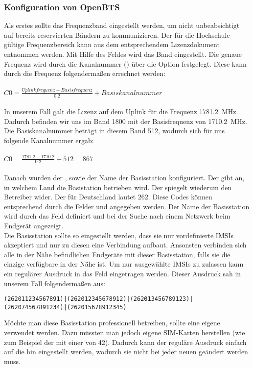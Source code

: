 \subsubsection{Konfiguration von OpenBTS}
Als erstes sollte das Frequenzband eingestellt werden, um nicht unbeabsichtigt auf bereits reservierten Bändern zu kommunizieren.  Der für die Hochschule gültige Frequenzbereich kann aus dem entsprechendem Lizenzdokument entnommen werden. Mit Hilfe des Feldes  wird das Band eingestellt. Die genaue Frequenz wird durch die Kanalnummer (\ARFCN) über die Option  festgelegt. Diese kann durch die Frequenz folgendermaßen errechnet werden:\\ \\
$ C0 = \frac{Uplinkfrequenz - Basisfrequenz}{0.2} + Basiskanalnummer $ \\ \\
In unserem Fall galt die Lizenz auf dem Uplink für die Frequenz \SI{1781.2}{\mega\hertz}. Dadurch befinden wir uns im Band 1800 mit der Basisfrequenz von \SI{1710.2}{\mega\hertz}. Die Basiskanalnummer beträgt in diesem Band 512, wodurch sich für uns folgende Kanalnummer ergab:\\ \\
$ C0 = \frac{1781.2 - 1710.2}{0.2} + 512 = 867 $ \\ \\
Danach wurden der \MCC, \MNC sowie der Name der Basisstation konfiguriert. Der \MCC gibt an, in welchem Land die Basistation betrieben wird. Der \MNC spiegelt wiederum den Betreiber wider. Der \MCC für Deutschland lautet 262. Diese Codes können entsprechend durch die Felder  und  angegeben werden. Der Name der Basisstation wird durch das Feld  definiert und bei der Suche nach einem Netzwerk beim Endgerät angezeigt. \\
Die Basisstation sollte so eingestellt werden, dass sie nur vordefinierte \acp{IMSI} akzeptiert und nur zu diesen eine Verbindung aufbaut. Ansonsten verbinden sich alle in der Nähe befindlichen Endgeräte mit dieser Basisstation, falls sie die einzige verfügbare in der Nähe ist. Um nur ausgewählte \acp{IMSI} zu zulassen kann ein regulärer Ausdruck in das Feld  eingetragen werden. Dieser Ausdruck sah in unserem Fall folgendermaßen aus: \\
\begin{lstlisting}
(262011234567891)|(262012345678912)|(262013456789123)|
(262074567891234)|(262015678912345)
\end{lstlisting}
Möchte man diese Basisstation professionell betreiben, sollte eine eigene \MNC verwendet werden. Dazu müssten man jedoch eigene SIM-Karten herstellen (wie zum Beispiel der \CCC mit einer \MNC von 42). Dadurch kann der reguläre Ausdruck einfach auf die \MNC hin eingestellt werden, wodurch sie nicht bei jeder neuen \IMSI geändert werden muss.


